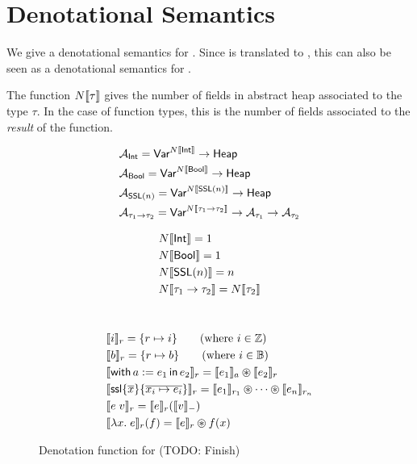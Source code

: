 \section{Denotational Semantics}

We give a denotational semantics for \PikaCore. Since \Pika{} is translated to \PikaCore, this can
also be seen as a denotational semantics for \Pika.

The function $N\llbracket \tau \rrbracket$ gives the number of fields in abstract
heap associated to the type $\tau$. In the case of function types, this
is the number of fields associated to the \textit{result} of the function.

\begin{align*}
  &\mathcal{A}_{\textsf{Int}} = \textsf{Var}^{N\llbracket \textsf{Int} \rrbracket} \rightarrow \textsf{Heap}
  \\
  &\mathcal{A}_{\textsf{Bool}} = \textsf{Var}^{N\llbracket \textsf{Bool} \rrbracket} \rightarrow \textsf{Heap}
  \\
  &\mathcal{A}_{\textsf{SSL}(n)} = \textsf{Var}^{N\llbracket \textsf{SSL}(n) \rrbracket} \rightarrow \textsf{Heap}
  \\
  &\mathcal{A}_{\tau_1 \rightarrow \tau_2} = \textsf{Var}^{N\llbracket \tau_1 \rightarrow \tau_2 \rrbracket} \rightarrow \mathcal{A}_{\tau_1} \rightarrow \mathcal{A}_{\tau_2}
\end{align*}

\begin{align*}
  &N\llbracket \textsf{Int} \rrbracket = 1
  \\
  &N\llbracket \textsf{Bool} \rrbracket = 1
  \\
  &N\llbracket \textsf{SSL}(n) \rrbracket = n
  \\
  &N\llbracket \tau_1 \rightarrow \tau_2 \rrbracket = N\llbracket \tau_2 \rrbracket
\end{align*}
\\

\begin{figure}
\begin{center}
\end{center}
\begin{align*}
  &\sem{i}_r = \{ r \mapsto i \}\tag{where $i \in \mathbb{Z}$}
  \\
  &\sem{b}_r = \{ r \mapsto b \}\tag{where $i \in \mathbb{B}$}
  \\
  &\sem{\withIn{a := e_1} e_2}_r = \sem{e_1}_a \osep \sem{e_2}_r
  \\
  &\sem{\ssl{\overline{x}}\{\overline{x_i \mapsto e_i}\}}_r =
    \sem{e_1}_{r_1} \osep \cdots \osep \sem{e_n}_{r_n}
  \\
  &\sem{e\; v}_r =
      \sem{e}_r(\sem{v}_{-})
  \\
  &\sem{\lambda x.\; e}_r(f)
      = \sem{e}_r \osep f(x)
\end{align*}
  \caption{Denotation function for \PikaCore ({\color{red}TODO}: Finish)}
\end{figure}


